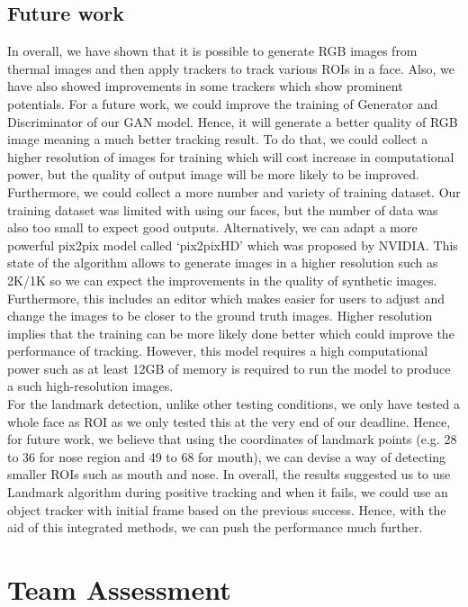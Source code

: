 \documentclass[conference]{IEEEtran}
\begin{document}
\subsection{Future work}
In overall, we have shown that it is possible to generate RGB images from thermal images and then apply trackers to track various ROIs in a face. Also, we have also showed improvements in some trackers which show prominent potentials. For a future work, we could improve the training of Generator and Discriminator of our GAN model. Hence, it will generate a better quality of RGB image meaning a much better tracking result. To do that, we could collect a higher resolution of images for training which will cost increase in computational power, but the quality of output image will be more likely to be improved. Furthermore, we could collect a more number and variety of training dataset. Our training dataset was limited with using our faces, but the number of data was also too small to expect good outputs. Alternatively, we can adapt a more powerful pix2pix model called ‘pix2pixHD’ which was proposed by NVIDIA\cite{b15}. 
This state of the algorithm allows to generate images in a higher resolution such as 2K/1K so we can expect the improvements in the quality of synthetic images. Furthermore, this includes an editor which makes easier for users to adjust and change the images to be closer to the ground truth images. Higher resolution implies that the training can be more likely done better which could improve the performance of tracking. However, this model requires a high computational power such as at least 12GB of memory\cite{b15} is required to run the model to produce a such high-resolution images. \\
For the landmark detection, unlike other testing conditions, we only have tested a whole face as ROI as we only tested this at the very end of our deadline. Hence, for future work, we believe that using the coordinates of landmark points (e.g. 28 to 36 for nose region and 49 to 68 for mouth\cite{b22}), we can devise a way of detecting smaller ROIs such as mouth and nose. In overall, the results suggested us to use Landmark\cite{b21} algorithm during positive tracking and when it fails, we could use an object tracker with initial frame based on the previous success. Hence, with the aid of this integrated methods, we can push the performance much further.
 
\section{Team Assessment}
\end{document}
